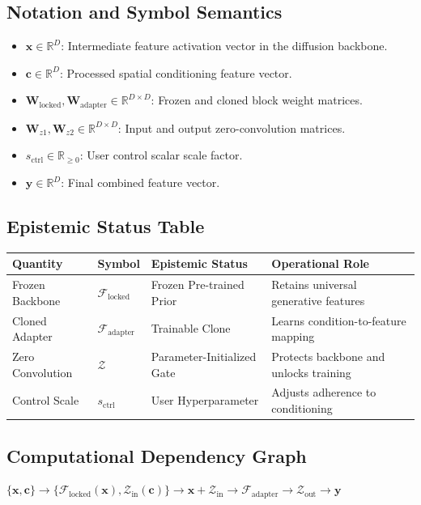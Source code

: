 \documentclass[11pt,a4paper]{article}
\theoremstyle{definition}
\begin{document}
\subsection{Notation and Symbol Semantics}
\begin{itemize}
    \item $\mathbf{x} \in \mathbb{R}^D$: Intermediate feature activation vector in the diffusion backbone.
    \item $\mathbf{c} \in \mathbb{R}^D$: Processed spatial conditioning feature vector.
    \item $\mathbf{W}_{\text{locked}}, \mathbf{W}_{\text{adapter}} \in \mathbb{R}^{D \times D}$: Frozen and cloned block weight matrices.
    \item $\mathbf{W}_{z1}, \mathbf{W}_{z2} \in \mathbb{R}^{D \times D}$: Input and output zero-convolution matrices.
    \item $s_{\text{ctrl}} \in \mathbb{R}_{\ge 0}$: User control scalar scale factor.
    \item $\mathbf{y} \in \mathbb{R}^D$: Final combined feature vector.
\end{itemize}

\subsection{Epistemic Status Table}
\begin{table}[h]
\centering
\small
\begin{tabular}{@{}llll@{}}
\toprule
\textbf{Quantity} & \textbf{Symbol} & \textbf{Epistemic Status} & \textbf{Operational Role} \\
\midrule
Frozen Backbone & $\mathcal{F}_{\text{locked}}$ & Frozen Pre-trained Prior & Retains universal generative features \\
Cloned Adapter & $\mathcal{F}_{\text{adapter}}$ & Trainable Clone & Learns condition-to-feature mapping \\
Zero Convolution & $\mathcal{Z}$ & Parameter-Initialized Gate & Protects backbone and unlocks training \\
Control Scale & $s_{\text{ctrl}}$ & User Hyperparameter & Adjusts adherence to conditioning \\
\bottomrule
\end{tabular}
\end{table}

\subsection{Computational Dependency Graph}
{\centering
$\{\mathbf{x}, \mathbf{c}\} \longrightarrow \{\mathcal{F}_{\text{locked}}(\mathbf{x}), \mathcal{Z}_{\text{in}}(\mathbf{c})\} \longrightarrow \mathbf{x} + \mathcal{Z}_{\text{in}} \longrightarrow \mathcal{F}_{\text{adapter}} \longrightarrow \mathcal{Z}_{\text{out}} \longrightarrow \mathbf{y}$
\par}
\end{document}
